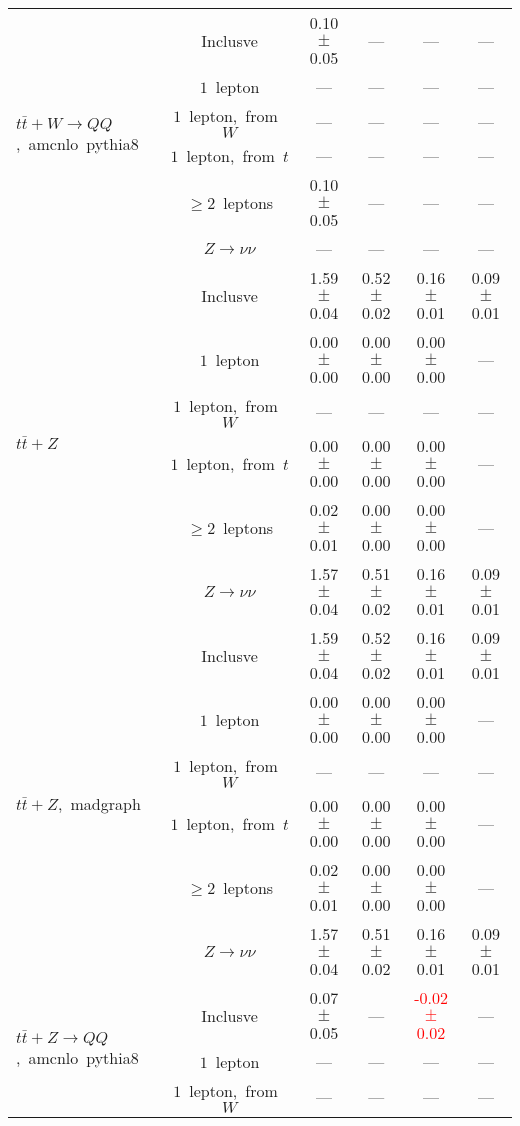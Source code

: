 \documentclass{article}
\begin{document}
\begin{longtable}{|l|c|c|c|c|c|}
\hline 
\multirow{6}{*}{$t\bar{t}+W{\rightarrow}QQ$,~amcnlo~pythia8} & Inclusve  & 0.10 $\pm$ 0.05  & ---  & ---  & --- \\* 
 & $1$~lepton  & ---  & ---  & ---  & --- \\* 
 & $1$~lepton,~from~$W$  & ---  & ---  & ---  & --- \\* 
 & $1$~lepton,~from~$t$  & ---  & ---  & ---  & --- \\* 
 & $\ge2$~leptons  & 0.10 $\pm$ 0.05  & ---  & ---  & --- \\* 
 & $Z\rightarrow\nu\nu$  & ---  & ---  & ---  & --- \\* 
\hline 
\multirow{6}{*}{$t\bar{t}+Z$} & Inclusve  & 1.59 $\pm$ 0.04  & 0.52 $\pm$ 0.02  & 0.16 $\pm$ 0.01  & 0.09 $\pm$ 0.01 \\* 
 & $1$~lepton  & 0.00 $\pm$ 0.00  & 0.00 $\pm$ 0.00  & 0.00 $\pm$ 0.00  & --- \\* 
 & $1$~lepton,~from~$W$  & ---  & ---  & ---  & --- \\* 
 & $1$~lepton,~from~$t$  & 0.00 $\pm$ 0.00  & 0.00 $\pm$ 0.00  & 0.00 $\pm$ 0.00  & --- \\* 
 & $\ge2$~leptons  & 0.02 $\pm$ 0.01  & 0.00 $\pm$ 0.00  & 0.00 $\pm$ 0.00  & --- \\* 
 & $Z\rightarrow\nu\nu$  & 1.57 $\pm$ 0.04  & 0.51 $\pm$ 0.02  & 0.16 $\pm$ 0.01  & 0.09 $\pm$ 0.01 \\* 
\hline 
\multirow{6}{*}{$t\bar{t}+Z$,~madgraph} & Inclusve  & 1.59 $\pm$ 0.04  & 0.52 $\pm$ 0.02  & 0.16 $\pm$ 0.01  & 0.09 $\pm$ 0.01 \\* 
 & $1$~lepton  & 0.00 $\pm$ 0.00  & 0.00 $\pm$ 0.00  & 0.00 $\pm$ 0.00  & --- \\* 
 & $1$~lepton,~from~$W$  & ---  & ---  & ---  & --- \\* 
 & $1$~lepton,~from~$t$  & 0.00 $\pm$ 0.00  & 0.00 $\pm$ 0.00  & 0.00 $\pm$ 0.00  & --- \\* 
 & $\ge2$~leptons  & 0.02 $\pm$ 0.01  & 0.00 $\pm$ 0.00  & 0.00 $\pm$ 0.00  & --- \\* 
 & $Z\rightarrow\nu\nu$  & 1.57 $\pm$ 0.04  & 0.51 $\pm$ 0.02  & 0.16 $\pm$ 0.01  & 0.09 $\pm$ 0.01 \\* 
\hline 
\multirow{6}{*}{$t\bar{t}+Z{\rightarrow}QQ$,~amcnlo~pythia8} & Inclusve  & 0.07 $\pm$ 0.05  & ---  & \textcolor{red}{ -0.02 $\pm$ 0.02 }  & --- \\* 
 & $1$~lepton  & ---  & ---  & ---  & --- \\* 
 & $1$~lepton,~from~$W$  & ---  & ---  & ---  & --- \\* 

\end{longtable}
\end{document}
